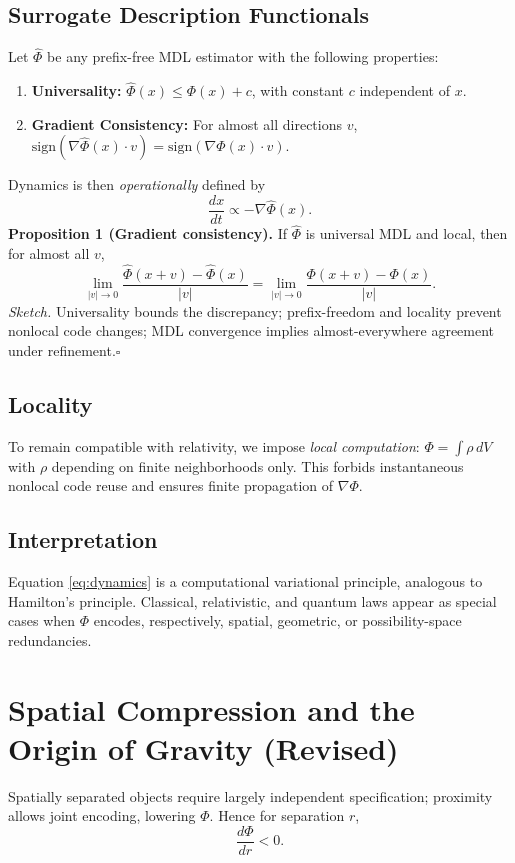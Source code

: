 \documentclass[aps,preprint,onecolumn,longbibliography,nofootinbib]{revtex4-2}
\numberwithin{equation}{section}        %
\begin{document}
\subsection{Surrogate Description Functionals}
Let $\widehat{\Phi}$ be any prefix-free MDL estimator with the following properties:
\begin{enumerate}
\item \textbf{Universality:} $\widehat{\Phi}(x) \le \Phi(x)+c$, with constant $c$ independent of $x$.
\item \textbf{Gradient Consistency:} For almost all directions $v$, $\mathrm{sign}(\nabla\widehat{\Phi}(x)\!\cdot\! v)=\mathrm{sign}(\nabla\Phi(x)\!\cdot\! v)$.
\end{enumerate}
Dynamics is then \emph{operationally} defined by
\begin{equation}
\frac{dx}{dt} \propto -\nabla \widehat{\Phi}(x). \label{eq:dynamics}
\end{equation}
\noindent\textbf{Proposition 1 (Gradient consistency).} If $\widehat{\Phi}$ is universal MDL and local, then for almost all $v$,
\[
\lim_{|v|\to 0} \frac{\widehat{\Phi}(x+v)-\widehat{\Phi}(x)}{|v|}
= \lim_{|v|\to 0} \frac{\Phi(x+v)-\Phi(x)}{|v|}.
\]
\emph{Sketch.} Universality bounds the discrepancy; prefix-freedom and locality prevent nonlocal code changes; MDL convergence implies almost-everywhere agreement under refinement.\hfill$\square$

\subsection{Locality}
To remain compatible with relativity, we impose \emph{local computation}: $\Phi=\int \rho\,dV$ with $\rho$ depending on finite neighborhoods only. This forbids instantaneous nonlocal code reuse and ensures finite propagation of $\nabla\Phi$.

\subsection{Interpretation}
Equation \eqref{eq:dynamics} is a computational variational principle, analogous to Hamilton’s principle. Classical, relativistic, and quantum laws appear as special cases when $\Phi$ encodes, respectively, spatial, geometric, or possibility-space redundancies.

\section{Spatial Compression and the Origin of Gravity (Revised)}
Spatially separated objects require largely independent specification; proximity allows joint encoding, lowering $\Phi$. Hence for separation $r$,
\begin{equation}
\frac{d\Phi}{dr} < 0. \label{eq:dphidr}
\end{equation}
\end{document}
